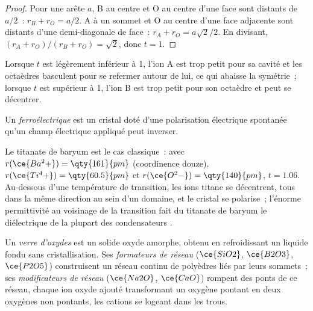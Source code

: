 \begin{proof}
Pour une arête $a$, B au centre et O au centre d'une face sont distants de $a/2$~: $r_B + r_O = a/2$.
A à un sommet et O au centre d'une face adjacente sont distants d'une
demi-diagonale de face~: $r_A + r_O = a\sqrt2/2$. En divisant, $(r_A + r_O)/(r_B + r_O) = \sqrt2$, donc $t = 1$.
\end{proof}

Lorsque $t$ est légèrement inférieur à 1, l'ion A est trop petit pour sa cavité et les
octaèdres basculent pour se refermer autour de lui, ce qui abaisse la symétrie~; lorsque $t$ est supérieur à 1,
l'ion B est trop petit pour son octaèdre et peut se décentrer.

\begin{definition}[Ferroélectrique]\label{def:b3:inorganic-materials:ferroelectric}
Un \emph{ferroélectrique} est un cristal doté d'une
polarisation électrique spontanée qu'un champ électrique appliqué peut
inverser.
\end{definition}

Le titanate de baryum est le cas classique~: avec $r(\ce{Ba^2+}) = \qty{161}{pm}$ (coordinence douze),
$r(\ce{Ti^4+}) = \qty{60.5}{pm}$ et $r(\ce{O^2-}) = \qty{140}{pm}$, $t = 1.06$. Au-dessous d'une température de transition, les
ions titane se décentrent, tous dans la même direction au sein d'un
domaine, et le cristal se polarise~; l'énorme permittivité au voisinage de
la transition fait du titanate de baryum le diélectrique de la plupart des
condensateurs .

\begin{definition}\label{def:b3:inorganic-materials:glass}
Un \emph{verre d'oxydes} est un solide oxyde amorphe,
obtenu en refroidissant un liquide fondu sans cristallisation. Ses
\emph{formateurs de réseau} ($\ce{SiO2}$, $\ce{B2O3}$, $\ce{P2O5}$) construisent un réseau continu
de polyèdres liés par leurs sommets~; ses \emph{modificateurs de réseau}
($\ce{Na2O}$, $\ce{CaO}$) rompent des ponts de ce réseau, chaque ion oxyde ajouté
transformant un oxygène pontant en deux oxygènes non pontants, les cations
se logeant dans les trous.
\end{definition}

